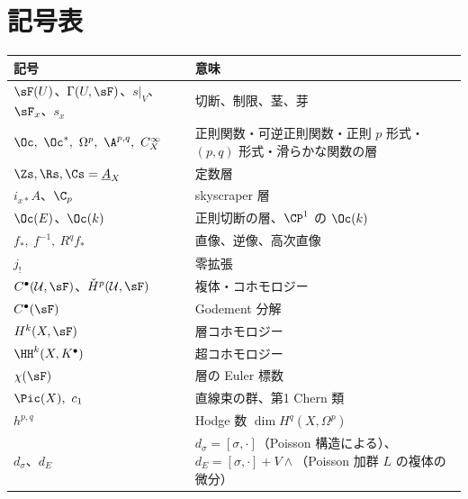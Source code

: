 \section*{記号表}
\begin{center}
\begin{tabular}{p{}p{}}
\toprule
記号 & 意味\\
\midrule
$\sF(U)$、$\Gamma(U,\sF)$、$s|_V$、$\sF_x$、$s_x$ & 切断、制限、茎、芽\\
$\Oc,\ \Oc^*,\ \Omega^p,\ \A^{p,q},\ C^\infty_X$ & 正則関数・可逆正則関数・正則 $p$ 形式・$(p,q)$ 形式・滑らかな関数の層\\
$\Zs,\Rs,\Cs=\underline A_X$ & 定数層\\
$i_{x*}A$、$\C_p$ & skyscraper 層\\
$\Oc(E)$、$\Oc(k)$ & 正則切断の層、$\CP^1$ の $\Oc(k)$\\
$f_*,\ f^{-1},\ R^qf_*$ & 直像、逆像、高次直像\\
$j_!$ & 零拡張\\
$C^\bullet(\mathcal U,\sF)$、$\check H^p(\mathcal U,\sF)$ & \Cech{} 複体・コホモロジー\\
$C^\bullet(\sF)$ & Godement 分解\\
$H^k(X,\sF)$ & 層コホモロジー\\
$\HH^k(X,K^\bullet)$ & 超コホモロジー\\
$\chi(\sF)$ & 層の Euler 標数\\
$\Pic(X),\ c_1$ & 直線束の群、第1 Chern 類\\
$h^{p,q}$ & Hodge 数 $\dim H^q(X,\Omega^p)$\\
$d_\sigma$、$d_E$ & $d_\sigma=[\sigma,\cdot]$（Poisson 構造による）、$d_E=[\sigma,\cdot]+V\wedge$（Poisson 加群 $L$ の複体の微分）\\
\bottomrule
\end{tabular}
\end{center}

